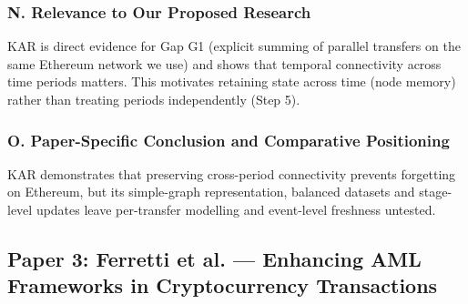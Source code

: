 \documentclass[11pt,a4paper]{article}
\begin{document}
\subsubsection*{N. Relevance to Our Proposed Research}
KAR is direct evidence for Gap G1 (explicit summing of parallel transfers on the same Ethereum network we use) and shows that temporal connectivity across time periods matters. This motivates retaining state across time (node memory) rather than treating periods independently (Step 5).

\subsubsection*{O. Paper-Specific Conclusion and Comparative Positioning}
KAR demonstrates that preserving cross-period connectivity prevents forgetting on Ethereum, but its simple-graph representation, balanced datasets and stage-level updates leave per-transfer modelling and event-level freshness untested.

\subsection{Paper 3: Ferretti et al. --- Enhancing AML Frameworks in Cryptocurrency Transactions}
\label{sec:p3_ferretti}
\end{document}
